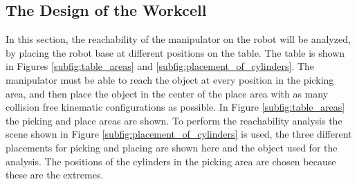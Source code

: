 \documentclass[../main.tex]{subfiles}
\begin{document}
\subsection{The Design of the Workcell} \label{subsec:workcell_design}
In this section, the reachability of the manipulator on the robot will be analyzed, by placing the robot base at different positions on the table. The table is shown in Figures \ref{subfig:table_areas} and \ref{subfig:placement_of_cylinders}. The manipulator must be able to reach the object at every position in the picking area, and then place the object in the center of the place area with as many collision free kinematic configurations as possible. In Figure \ref{subfig:table_areas} the picking and place areas are shown. To perform the reachability analysis the scene shown in Figure \ref{subfig:placement_of_cylinders} is used, the three different placements for picking and placing are shown here and the object used for the analysis. The positions of the cylinders in the picking area are chosen because these are the extremes.
\end{document}
